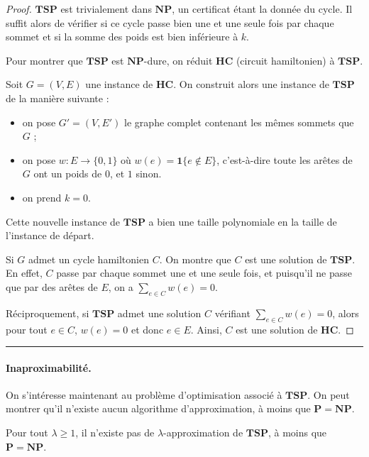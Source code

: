 \begin{proof}
$\mathbf{TSP}$ est trivialement dans $\mathbf{NP}$, un certificat étant la donnée du cycle. Il suffit alors de vérifier si ce cycle passe bien une et une seule fois par chaque sommet et si la somme des poids est bien inférieure à $k$.\newline

Pour montrer que $\mathbf{TSP}$ est $\mathbf{NP}$-dure, on réduit $\mathbf{HC}$ (circuit hamiltonien) à $\mathbf{TSP}$.

Soit $G=(V,E)$ une instance de $\mathbf{HC}$. On construit alors une instance de $\mathbf{TSP}$ de la manière suivante :
\begin{itemize}
\item on pose $G'=(V,E')$ le graphe complet contenant les mêmes sommets que $G$ ;
\item on pose $w : E \rightarrow \{0,1\}$ où $w(e) = \mathbf{1}\{e\notin E\}$, c'est-à-dire toute les arêtes de $G$ ont un poids de $0$, et $1$ sinon.
\item on prend $k=0$.
\end{itemize}
Cette nouvelle instance de $\mathbf{TSP}$ a bien une taille polynomiale en la taille de l'instance de départ.

Si $G$ admet un cycle hamiltonien $C$. On montre que $C$ est une solution de $\mathbf{TSP}$. En effet, $C$ passe par chaque sommet une et une seule fois, et puisqu'il ne passe que par des arêtes de $E$, on a $\sum_{e\in C} w(e)=0$.

Réciproquement, si $\mathbf{TSP}$ admet une solution $C$ vérifiant $\sum_{e\in C}w(e)=0$, alors pour tout $e\in C$, $w(e)=0$ et donc $e\in E$. Ainsi, $C$ est une solution de $\mathbf{HC}$.
\end{proof}

\noindent\rule{1\linewidth}{1pt}

\paragraph{Inaproximabilité.} On s'intéresse maintenant au problème d'optimisation associé à $\mathbf{TSP}$. On peut montrer qu'il n'existe aucun algorithme d'approximation, à moins que $\mathbf{P}=\mathbf{NP}$.


\begin{theorem}
Pour tout $\lambda \geq 1$, il n'existe pas de $\lambda$-approximation de $\mathbf{TSP}$, à moins que $\mathbf{P}=\mathbf{NP}$. 
\end{theorem}

